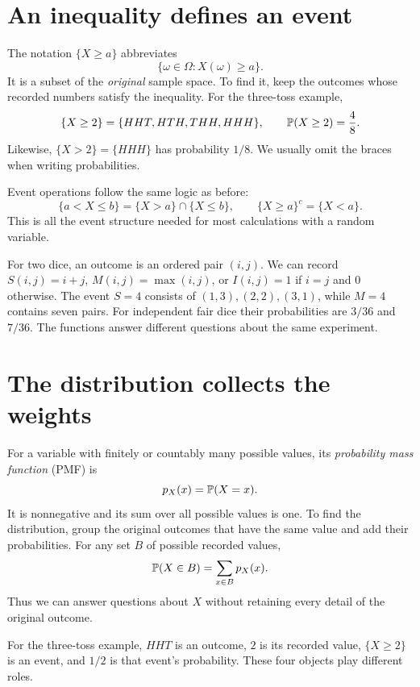 \section{An inequality defines an event}
\label{sec:rv-events}

The notation $\{X\ge a\}$ abbreviates
\[
 \{\omega\in\Omega:X(\omega)\ge a\}.
\]
It is a subset of the \emph{original} sample space. To find it, keep the
outcomes whose recorded numbers satisfy the inequality. For the
three-toss example,
\[
 \{X\ge2\}=\{HHT,HTH,THH,HHH\},\qquad \P(X\ge2)=\frac48.
\]
Likewise, $\{X>2\}=\{HHH\}$ has probability $1/8$.
We usually omit the braces when writing probabilities.

Event operations follow the same logic as before:
\[
 \{a<X\le b\}=\{X>a\}\cap\{X\le b\},\qquad
 \{X\ge a\}^c=\{X<a\}.
\]
This is all the event structure needed for most calculations with a
random variable.

\begin{example}
For two dice, an outcome is an ordered pair $(i,j)$. We can record
$S(i,j)=i+j$, $M(i,j)=\max(i,j)$, or
$I(i,j)=1$ if $i=j$ and $0$ otherwise. The event $S=4$ consists of
$(1,3),(2,2),(3,1)$, while $M=4$ contains seven pairs.
For independent fair dice their probabilities are $3/36$ and $7/36$.
The functions answer different questions about the same experiment.
\end{example}

\section{The distribution collects the weights}

For a variable with finitely or countably many possible values, its
\emph{probability mass function} (PMF) is
\[
 p_X(x)=\P(X=x).
\]
It is nonnegative and its sum over all possible values is one. To find
the distribution, group the original outcomes that have the same value
and add their probabilities. For any set $B$ of possible recorded values,
\[
 \P(X\in B)=\sum_{x\in B}p_X(x).
\]
Thus we can answer questions about $X$ without retaining every detail
of the original outcome.

\begin{checkpoint}[title={Outcome, value, event, probability}]
For the three-toss example, $HHT$ is an outcome, $2$ is its recorded
value, $\{X\ge2\}$ is an event, and $1/2$ is that event's probability.
These four objects play different roles.
\end{checkpoint}

